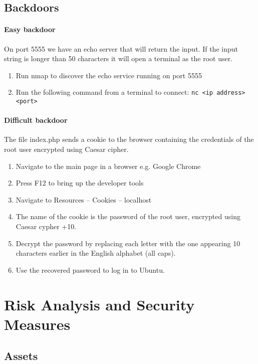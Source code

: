 \documentclass{article}
\begin{document}
\subsection{Backdoors}

\paragraph{Easy backdoor}
On port 5555 we have an echo server that will return the input.
If the input string is longer than 50 characters it will open a terminal as the root user.

\begin{enumerate}
	\item Run nmap to discover the echo service running on port 5555
	\item Run the following command from a terminal to connect: \texttt{nc <ip address> <port>}
\end{enumerate}

\paragraph{Difficult backdoor}
The file index.php sends a cookie to the browser containing the credentials of the root user encrypted using Caesar cipher.

\begin{enumerate}
	\item Navigate to the main page in a browser e.g. Google Chrome
	\item Press F12 to bring up the developer tools
	\item Navigate to Resources -- Cookies -- localhost
	\item The name of the cookie is the password of the root user, encrypted using Caesar cypher +10.
	\item Decrypt the password by replacing each letter with the one appearing 10 characters earlier in the English alphabet (all caps).
	\item Use the recovered password to log in to Ubuntu.
\end{enumerate}


\section{Risk Analysis and Security Measures}

\subsection{Assets}
\end{document}
